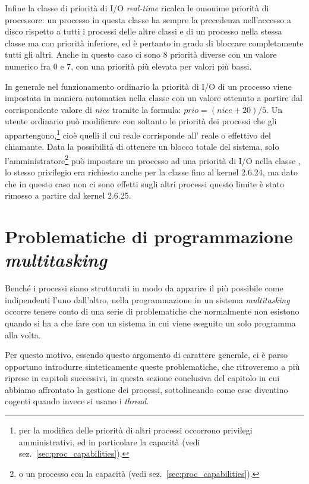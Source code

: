 Infine la classe di priorità di I/O \textit{real-time}
 ricalca le omonime priorità di processore: un
processo in questa classe ha sempre la precedenza nell'accesso a disco
rispetto a tutti i processi delle altre classi e di un processo nella stessa
classe ma con priorità inferiore, ed è pertanto in grado di bloccare
completamente tutti gli altri. Anche in questo caso ci sono 8 priorità diverse
con un valore numerico fra 0 e 7, con una priorità più elevata per valori più
bassi.

In generale nel funzionamento ordinario la priorità di I/O di un processo
viene impostata in maniera automatica nella classe 
con un valore ottenuto a partire dal corrispondente valore di \textit{nice}
tramite la formula: $\mathtt{\mathit{prio}}=(\mathtt{\mathit{nice}}+20)/5$. Un
utente ordinario può modificare con  soltanto le priorità
dei processi che gli appartengono,\footnote{per la modifica delle priorità di
  altri processi occorrono privilegi amministrativi, ed in particolare la
  capacità  (vedi sez.~\ref{sec:proc_capabilities}).}
cioè quelli il cui  reale corrisponde all' reale o effettivo
del chiamante. Data la possibilità di ottenere un blocco totale del sistema,
solo l'amministratore\footnote{o un processo con la capacità
   (vedi sez.~\ref{sec:proc_capabilities}).} può
impostare un processo ad una priorità di I/O nella classe
, lo stesso privilegio era richiesto anche per la
classe  fino al kernel 2.6.24, ma dato che in
questo caso non ci sono effetti sugli altri processi questo limite è stato
rimosso a partire dal kernel 2.6.25.



\section{Problematiche di programmazione \textit{multitasking}}
\label{sec:proc_multi_prog}

Benché i processi siano strutturati in modo da apparire il più possibile come
indipendenti l'uno dall'altro, nella programmazione in un sistema
\textit{multitasking} occorre tenere conto di una serie di problematiche che
normalmente non esistono quando si ha a che fare con un sistema in cui viene
eseguito un solo programma alla volta.

Per questo motivo, essendo questo argomento di carattere generale, ci è parso
opportuno introdurre sinteticamente queste problematiche, che ritroveremo a
più riprese in capitoli successivi, in questa sezione conclusiva del capitolo
in cui abbiamo affrontato la gestione dei processi, sottolineando come esse
diventino cogenti quando invece si usano i \textit{thread}.


